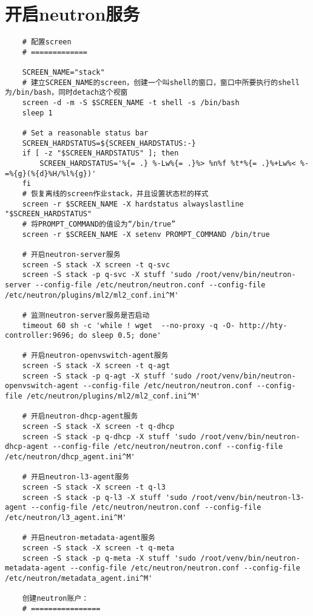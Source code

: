 \documentclass[a4paper,left=1.5cm,right=1.5cm,11pt]{article}
\begin{document}
\section{开启neutron服务}
	\begin{lstlisting}
	# 配置screen
	# =============
	
	SCREEN_NAME="stack"
	# 建立SCREEN_NAME的screen，创建一个叫shell的窗口，窗口中所要执行的shell为/bin/bash，同时detach这个视窗
	screen -d -m -S $SCREEN_NAME -t shell -s /bin/bash
    sleep 1

    # Set a reasonable status bar
    SCREEN_HARDSTATUS=${SCREEN_HARDSTATUS:-}
    if [ -z "$SCREEN_HARDSTATUS" ]; then
        SCREEN_HARDSTATUS='%{= .} %-Lw%{= .}%> %n%f %t*%{= .}%+Lw%< %-=%{g}(%{d}%H/%l%{g})'
    fi
	# 恢复离线的screen作业stack，并且设置状态栏的样式
    screen -r $SCREEN_NAME -X hardstatus alwayslastline "$SCREEN_HARDSTATUS"
	# 将PROMPT_COMMAND的值设为“/bin/true”
    screen -r $SCREEN_NAME -X setenv PROMPT_COMMAND /bin/true

	# 开启neutron-server服务
	screen -S stack -X screen -t q-svc
	screen -S stack -p q-svc -X stuff 'sudo /root/venv/bin/neutron-server --config-file /etc/neutron/neutron.conf --config-file /etc/neutron/plugins/ml2/ml2_conf.ini^M'

	# 监测neutron-server服务是否启动
	timeout 60 sh -c 'while ! wget  --no-proxy -q -O- http://hty-controller:9696; do sleep 0.5; done'

	# 开启neutron-openvswitch-agent服务
	screen -S stack -X screen -t q-agt
	screen -S stack -p q-agt -X stuff 'sudo /root/venv/bin/neutron-openvswitch-agent --config-file /etc/neutron/neutron.conf --config-file /etc/neutron/plugins/ml2/ml2_conf.ini^M'

	# 开启neutron-dhcp-agent服务
	screen -S stack -X screen -t q-dhcp
	screen -S stack -p q-dhcp -X stuff 'sudo /root/venv/bin/neutron-dhcp-agent --config-file /etc/neutron/neutron.conf --config-file /etc/neutron/dhcp_agent.ini^M'

	# 开启neutron-l3-agent服务
	screen -S stack -X screen -t q-l3
	screen -S stack -p q-l3 -X stuff 'sudo /root/venv/bin/neutron-l3-agent --config-file /etc/neutron/neutron.conf --config-file /etc/neutron/l3_agent.ini^M'

	# 开启neutron-metadata-agent服务
	screen -S stack -X screen -t q-meta
	screen -S stack -p q-meta -X stuff 'sudo /root/venv/bin/neutron-metadata-agent --config-file /etc/neutron/neutron.conf --config-file /etc/neutron/metadata_agent.ini^M'

	创建neutron账户：
	# ================


\end{lstlisting}
\end{document}
